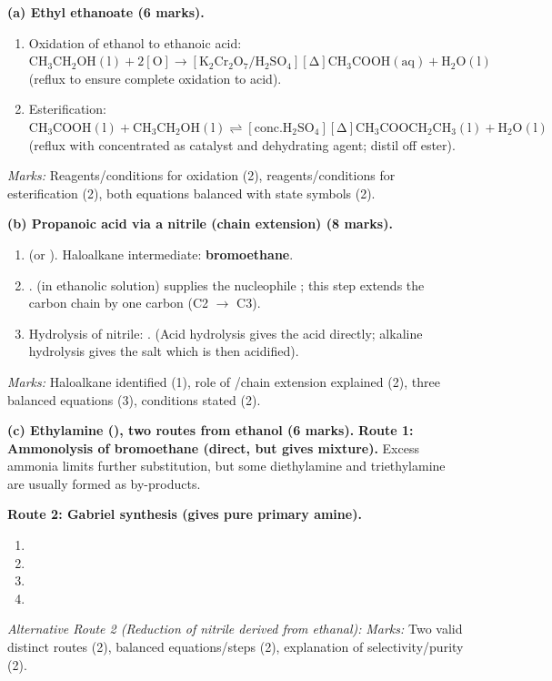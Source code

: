 \documentclass[11pt]{article}
\begin{document}
\begin{corrige}
\textbf{(a) Ethyl ethanoate (6 marks).}
\begin{enumerate}
\item Oxidation of ethanol to ethanoic acid: \ensuremath{\mathrm{CH_{3}CH_{2}OH(l) + 2[O] \rightarrow [K_{2}Cr_{2}O_{7}/H_{2}SO_{4}][\Delta] CH_{3}COOH(aq) + H_{2}O(l)}} (reflux to ensure complete oxidation to acid).
\item Esterification: \ensuremath{\mathrm{CH_{3}COOH(l) + CH_{3}CH_{2}OH(l) \rightleftharpoons [conc. H_{2}SO_{4}][\Delta] CH_{3}COOCH_{2}CH_{3}(l) + H_{2}O(l)}} (reflux with concentrated  as catalyst and dehydrating agent; distil off ester).
\end{enumerate}
\textit{Marks:} Reagents/conditions for oxidation (2), reagents/conditions for esterification (2), both equations balanced with state symbols (2).

\textbf{(b) Propanoic acid via a nitrile (chain extension) (8 marks).}
\begin{enumerate}
\item {} (or ). Haloalkane intermediate: \textbf{bromoethane}.
\item {}.  (in ethanolic solution) supplies the nucleophile ; this step extends the carbon chain by one carbon (C2 $\to$ C3).
\item Hydrolysis of nitrile: . (Acid hydrolysis gives the acid directly; alkaline hydrolysis gives the salt which is then acidified).
\end{enumerate}
\textit{Marks:} Haloalkane identified (1), role of /chain extension explained (2), three balanced equations (3), conditions stated (2).

\textbf{(c) Ethylamine (), two routes from ethanol (6 marks).}
\textbf{Route 1: Ammonolysis of bromoethane (direct, but gives mixture).}
Excess ammonia limits further substitution, but some diethylamine and triethylamine are usually formed as by-products.

\textbf{Route 2: Gabriel synthesis (gives pure primary amine).}
\begin{enumerate}
\item {}
\item {}
\item {}
\item {}
\end{enumerate}
\textit{Alternative Route 2 (Reduction of nitrile derived from ethanal):}
\textit{Marks:} Two valid distinct routes (2), balanced equations/steps (2), explanation of selectivity/purity (2).
\end{corrige}
\end{document}

